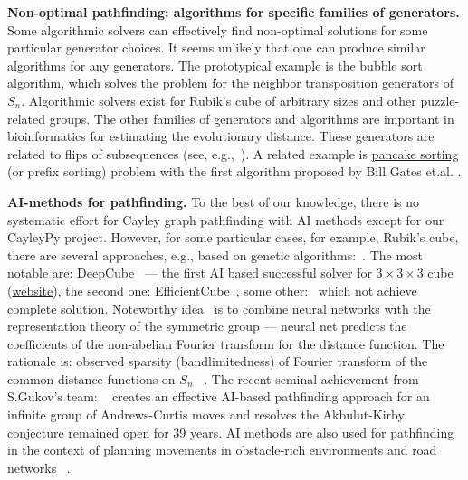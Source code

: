 \documentclass[reqno,11pt]{amsart}
\begin{document}
{\bf Non-optimal pathfinding: algorithms for specific families of generators.} 
Some algorithmic solvers can effectively find non-optimal solutions for some particular generator choices. It seems unlikely that one can produce similar algorithms for any generators. The prototypical example is the bubble sort algorithm, which solves the problem for the neighbor transposition generators of $S_n$. Algorithmic solvers exist for Rubik's cube of arbitrary sizes and other puzzle-related groups. The other families of generators  and algorithms are important in bioinformatics for estimating the evolutionary distance. These generators are related to flips of subsequences (see, e.g.,~\cite{Pevzner1995human2mice, Pevzner1999cabbage2turnip, bulteau2019parameterized}). A related example is \href{https://en.wikipedia.org/wiki/Pancake_sorting}{pancake sorting} (or prefix sorting) problem with the first algorithm proposed by Bill Gates et.al. \cite{gates1979bounds}.

{\bf AI-methods for pathfinding.} 
To the best of our knowledge, there is no systematic effort for Cayley graph pathfinding with AI methods except for our CayleyPy project. However, for some particular cases, for example, Rubik's cube, there are several approaches, e.g., based on genetic algorithms:~\cite{swita2023solving}.%
The most notable are: DeepCube~\cite{mcaleer2019solving, agostinelli2019solving, khandelwal2024towards,agostinelli2024q} --- the first AI based successful solver for $3\times 3\times 3$ cube (\href{https://deepcube.igb.uci.edu/}{website}), the second one: EfficientCube~\cite{takano2023selfsupervision}, some other:~\cite{brunetto2017deep,johnson2021solving,amrutha2022deep,noever2022puzzle,chasmai2022cubetr,bedaywi2023solving,pan2021fourier} which not achieve complete solution. Noteworthy idea~\cite{pan2021fourier} is to combine neural networks with the representation theory of the symmetric group ---  neural net  predicts the coefficients of the non-abelian Fourier transform for the distance function. The rationale is: observed sparsity (bandlimitedness) of Fourier transform of the common distance functions on $S_n$ ~\cite{swan2017harmonic}. The recent seminal achievement from S.Gukov's team: ~\cite{shehper2024makes} creates an effective AI-based pathfinding approach for an infinite group of Andrews-Curtis moves and resolves the  Akbulut-Kirby conjecture remained open for 39 years. AI methods are also used for pathfinding in the context of planning movements in obstacle-rich environments and road networks~ \cite{pandy2022learning, kirilenko2023transpath}.
\end{document}
